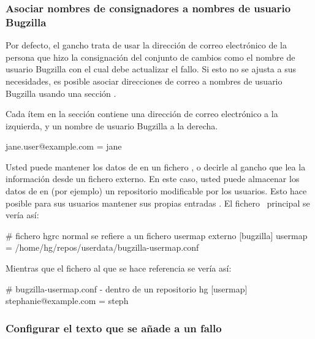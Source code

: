\subsubsection{Asociar nombres de consignadores a nombres de usuario
Bugzilla}

Por defecto, el gancho  trata de usar la dirección de
correo electrónico de la persona que hizo la consignación del conjunto
de cambios como el nombre de usuario Bugzilla con el cual debe
actualizar el fallo. Si esto no se ajusta a sus necesidades, es
posible asociar direcciones de correo a nombres de usuario Bugzilla
usando una sección .

Cada ítem en la sección  contiene una dirección de
correo electrónico a la izquierda, y un nombre de usuario Bugzilla a
la derecha.
\begin{codesample2}
  [usermap]
  jane.user@example.com = jane
\end{codesample2}
Usted puede mantener los datos de  en un fichero
\hgrc, o decirle al gancho  que lea la información
desde un fichero  externo.  En este caso, usted
puede almacenar los datos de  en (por ejemplo) un
repositorio modificable por los usuarios. Esto hace posible para sus
usuarios mantener sus propias entradas .  El
fichero \hgrc\ principal se vería así:
\begin{codesample2}
  # fichero hgrc normal se refiere a un fichero usermap externo
  [bugzilla]
  usermap = /home/hg/repos/userdata/bugzilla-usermap.conf
\end{codesample2}
Mientras que el fichero  al que se hace referencia
se vería así:
\begin{codesample2}
  # bugzilla-usermap.conf - dentro de un repositorio hg
  [usermap]
  stephanie@example.com = steph
\end{codesample2}

\subsubsection{Configurar el texto que se añade a un fallo}

